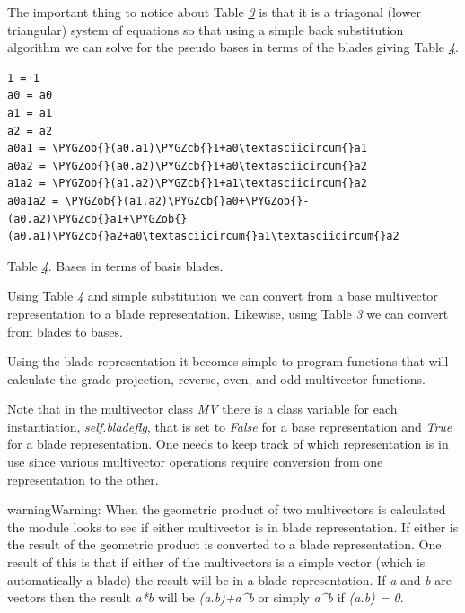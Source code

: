 \documentclass[letterpaper,10pt,english]{sphinxmanual}
\def\PYGZob{\char`\{}
\def\PYGZcb{\char`\}}
\begin{document}
The important thing to notice about Table {\hyperref[GA:table3]{\emph{3}}} is that it is a
triagonal (lower triangular) system of equations so that using a simple back
substitution algorithm we can solve for the pseudo bases in terms of the blades
giving Table {\hyperref[GA:table4]{\emph{4}}}.
\label{GA:table4}
\begin{Verbatim}[commandchars=\\\{\}]
1 = 1
a0 = a0
a1 = a1
a2 = a2
a0a1 = \PYGZob{}(a0.a1)\PYGZcb{}1+a0\textasciicircum{}a1
a0a2 = \PYGZob{}(a0.a2)\PYGZcb{}1+a0\textasciicircum{}a2
a1a2 = \PYGZob{}(a1.a2)\PYGZcb{}1+a1\textasciicircum{}a2
a0a1a2 = \PYGZob{}(a1.a2)\PYGZcb{}a0+\PYGZob{}-(a0.a2)\PYGZcb{}a1+\PYGZob{}(a0.a1)\PYGZcb{}a2+a0\textasciicircum{}a1\textasciicircum{}a2
\end{Verbatim}

Table {\hyperref[GA:table4]{\emph{4}}}. Bases in terms of basis blades.

Using Table {\hyperref[GA:table4]{\emph{4}}} and simple substitution we can convert from a base
multivector representation to a blade representation.  Likewise, using Table
{\hyperref[GA:table3]{\emph{3}}} we can convert from blades to bases.

Using the blade representation it becomes simple to program functions that will
calculate the grade projection, reverse, even, and odd multivector functions.

Note that in the multivector class \emph{MV} there is a class variable for each
instantiation, \emph{self.bladeflg}, that is set to \emph{False} for a base representation
and \emph{True} for a blade representation.  One needs to keep track of which
representation is in use since various multivector operations require conversion
from one representation to the other.

\begin{notice}{warning}{Warning:}
When the geometric product of two multivectors is calculated the module looks to
see if either multivector is in blade representation.  If either is the result of
the geometric product is converted to a blade representation.  One result of this
is that if either of the multivectors is a simple vector (which is automatically a
blade) the result will be in a blade representation.  If \emph{a} and \emph{b} are vectors
then the result \emph{a*b} will be \emph{(a.b)+a\textasciicircum{}b} or simply \emph{a\textasciicircum{}b} if \emph{(a.b) = 0}.
\end{notice}
\end{document}

